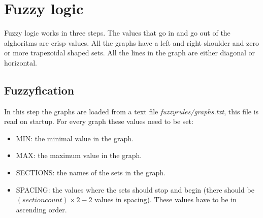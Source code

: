 \documentclass[10pt]{extarticle} %
\begin{document}
    \newpage
   \section {Fuzzy logic}
   Fuzzy logic works in three steps. The values that go in and go out of the alghoritms are crisp values. All the graphs have a left and right shoulder and zero or more trapezoidal shaped sets. All the lines in the graph are either diagonal or horizontal.
   \subsection{Fuzzyfication}
   In this step the graphs are loaded from a text file \emph{fuzzyrules/graphs.txt}, this file is read on startup. For every graph these values need to be set: 
   \begin{itemize}
   \item MIN: the minimal value in the graph.
   \item MAX: the maximum value in the graph.
   \item SECTIONS: the names of the sets in the graph.
   \item SPACING: the values where the sets should stop and begin (there should be \( (section count) \times 2 - 2\) values in spacing). These values have to be in ascending order.
   \end{itemize}
\end{document}
